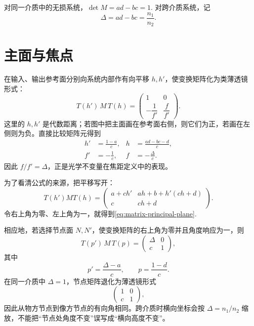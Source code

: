 对同一介质中的无损系统，\(\det M=ad-bc=1\). 对跨介质系统，记
\begin{equation}
	\Delta=ad-bc=\frac{n_1}{n_2}.
\end{equation}

\section{主面与焦点}

在输入、输出参考面分别向系统内部作有向平移 \(h,h'\)，使变换矩阵化为类薄透镜形式：
\begin{equation}
	T(h')\,M\,T(h)
	=
	\begin{pmatrix}
		1&0\\[2pt]-\dfrac{1}{f'}&\dfrac{f}{f'}
	\end{pmatrix}.
\end{equation}
这里的 \(h,h'\) 是代数距离；若图中把主面画在参考面右侧，则它们为正，若画在左侧则为负。直接比较矩阵元得到
\begin{align}
	h'&=\frac{1-a}{c},&
h&=\frac{ad-bc-d}{c},\label{eq:matrix-principal-plane}\\
	f'&=-\frac{1}{c},&
	f&=-\frac{\Delta}{c}.\label{eq:matrix-focal-length}
\end{align}
因此 \(f/f'=\Delta\)，正是光学不变量在焦距定义中的表现。

为了看清公式的来源，把平移写开：
\begin{equation}
	T(h')MT(h)=
	\begin{pmatrix}
	a+ch'&ah+b+h'(ch+d)\\
	c&ch+d
	\end{pmatrix}.
\end{equation}
令右上角为零、左上角为一，就得到\cref{eq:matrix-principal-plane}.

相应地，若选择节点面 \(N,N'\)，使变换矩阵的右上角为零并且角度响应为一，则
\begin{equation}
	T(p')\,M\,T(p)=
	\begin{pmatrix}
		\Delta&0\\ c&1
	\end{pmatrix},
\end{equation}
其中
\begin{equation}
	p'=\frac{\Delta-a}{c},\qquad
	p=\frac{1-d}{c}.
\end{equation}
在同一介质中 \(\Delta=1\)，节点矩阵退化为薄透镜形式
\[
	\begin{pmatrix}1&0\\c&1\end{pmatrix},
\]
因此从物方节点到像方节点的有向角相同。跨介质时横向坐标会按 \(\Delta=n_1/n_2\) 缩放，不能把“节点处角度不变”误写成“横向高度不变”。

